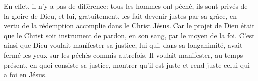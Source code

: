 En effet, il n’y a pas de différence:
	tous les hommes ont péché, ils sont privés de la gloire de Dieu,
	et lui, gratuitement, les fait devenir justes par sa grâce,
	en vertu de la rédemption accomplie dans le Christ Jésus.
Car le projet de Dieu était que le Christ soit instrument de pardon,
	en son sang, par le moyen de la foi.
C’est ainsi que Dieu voulait manifester sa justice,
	lui qui, dans sa longanimité,
		avait fermé les yeux sur les péchés commis autrefois.
Il voulait manifester, au temps présent, en quoi consiste sa justice,
	montrer qu’il est juste et rend juste celui qui a foi en Jésus.
